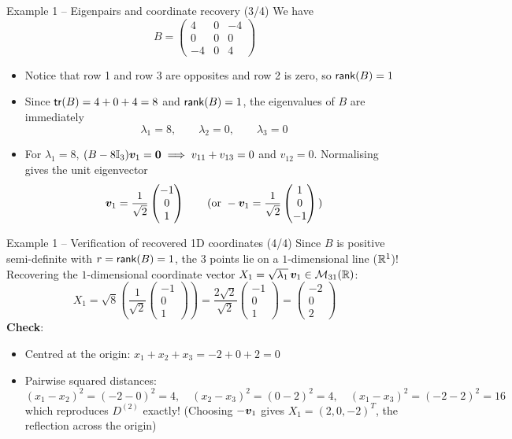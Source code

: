 \documentclass[aspectratio=169]{beamer}\usepackage[]{graphicx}\usepackage[]{xcolor}
\begin{document}
\begin{frame}{Example 1 -- Eigenpairs and coordinate recovery (3/4)}
We have
\[
B = \begin{pmatrix}
4 & 0 & -4 \\
0 & 0 & 0 \\
-4 & 0 & 4
\end{pmatrix}
\]
\vfill
\begin{itemize}
\item Notice that row 1 and row 3 are opposites and row 2 is zero, so $\mathsf{rank}(B) = 1$
\item Since $\mathsf{tr}(B) = 4 + 0 + 4 = 8$ and $\mathsf{rank}(B) = 1$, the eigenvalues of $B$ are immediately
\[
\lambda_1 = 8, \qquad \lambda_2 = 0, \qquad \lambda_3 = 0
\]
\item For $\lambda_1 = 8$, $(B - 8\II_3)\bv_1 = \b0 \implies v_{11} + v_{13} = 0$ and $v_{12} = 0$. Normalising gives the unit eigenvector
\[
\bm{v}_1 = \frac{1}{\sqrt{2}}\begin{pmatrix} -1 \\ 0 \\ 1 \end{pmatrix} \qquad \text{(or } -\bm{v}_1 = \frac{1}{\sqrt{2}}\begin{pmatrix} 1 \\ 0 \\ -1 \end{pmatrix}\text{)}
\]
\end{itemize}
\end{frame}

\begin{frame}{Example 1 -- Verification of recovered 1D coordinates (4/4)}
Since $B$ is positive semi-definite with $r = \mathsf{rank}(B) = 1$, the $3$ points lie on a $1$-dimensional line ($\mathbb{R}^1$)!
\vfill
Recovering the $1$-dimensional coordinate vector $X_1 = \sqrt{\lambda_1}\,\bm{v}_1 \in \mathcal{M}_{31}(\mathbb{R})$:
\[
X_1 = \sqrt{8}\left(\frac{1}{\sqrt{2}}\begin{pmatrix} -1 \\ 0 \\ 1 \end{pmatrix}\right)
= \frac{2\sqrt{2}}{\sqrt{2}}\begin{pmatrix} -1 \\ 0 \\ 1 \end{pmatrix}
= \begin{pmatrix} -2 \\ 0 \\ 2 \end{pmatrix}
\]
\vfill
\textbf{Check}:
\begin{itemize}
\item Centred at the origin: $x_1 + x_2 + x_3 = -2 + 0 + 2 = 0$
\item Pairwise squared distances:
\[
(x_1 - x_2)^2 = (-2 - 0)^2 = 4, \quad
(x_2 - x_3)^2 = (0 - 2)^2 = 4, \quad
(x_1 - x_3)^2 = (-2 - 2)^2 = 16
\]
which reproduces $D^{(2)}$ exactly! (Choosing $-\bm{v}_1$ gives $X_1 = (2, 0, -2)^T$, the reflection across the origin)
\end{itemize}
\end{frame}
\end{document}
